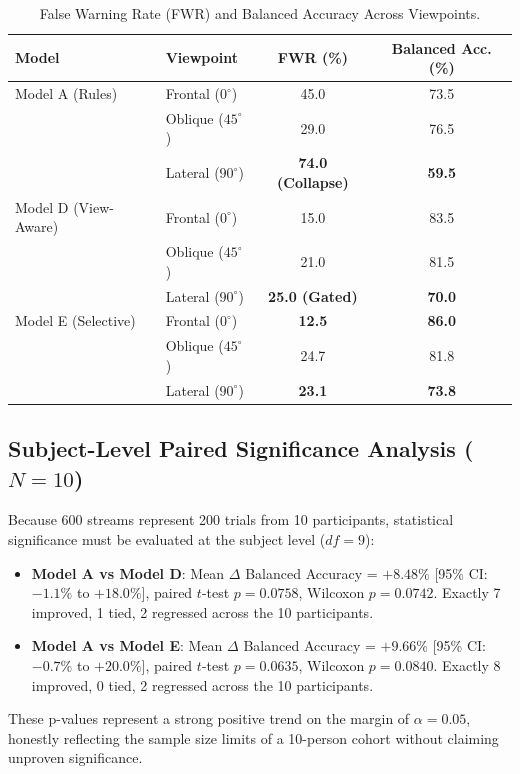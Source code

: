 \documentclass[10pt,journal,compsoc]{IEEEtran}
\begin{document}
\begin{table}[h]
\centering
\caption{False Warning Rate (FWR) and Balanced Accuracy Across Viewpoints.}
\label{tab:view_breakdown}
\small
\begin{tabular}{llcc}
\toprule
\textbf{Model} & \textbf{Viewpoint} & \textbf{FWR (\%)} & \textbf{Balanced Acc. (\%)} \\
\midrule
Model A (Rules) & Frontal ($0^\circ$) & 45.0 & 73.5 \\
                & Oblique ($45^\circ$) & 29.0 & 76.5 \\
                & Lateral ($90^\circ$) & \textbf{74.0 (Collapse)} & \textbf{59.5} \\
\midrule
Model D (View-Aware) & Frontal ($0^\circ$) & 15.0 & 83.5 \\
                     & Oblique ($45^\circ$) & 21.0 & 81.5 \\
                     & Lateral ($90^\circ$) & \textbf{25.0 (Gated)} & \textbf{70.0} \\
\midrule
Model E (Selective)  & Frontal ($0^\circ$) & \textbf{12.5} & \textbf{86.0} \\
                     & Oblique ($45^\circ$) & 24.7 & 81.8 \\
                     & Lateral ($90^\circ$) & \textbf{23.1} & \textbf{73.8} \\
\bottomrule
\end{tabular}
\end{table}

\subsection{Subject-Level Paired Significance Analysis ($N=10$)}
Because 600 streams represent 200 trials from 10 participants, statistical significance must be evaluated at the subject level ($df=9$):
\begin{itemize}
    \item \textbf{Model A vs Model D}: Mean $\Delta$ Balanced Accuracy = \textbf{$+8.48\%$} [95\% CI: $-1.1\%$ to $+18.0\%$], paired $t$-test $p = 0.0758$, Wilcoxon $p = 0.0742$. Exactly 7 improved, 1 tied, 2 regressed across the 10 participants.
    \item \textbf{Model A vs Model E}: Mean $\Delta$ Balanced Accuracy = \textbf{$+9.66\%$} [95\% CI: $-0.7\%$ to $+20.0\%$], paired $t$-test $p = 0.0635$, Wilcoxon $p = 0.0840$. Exactly 8 improved, 0 tied, 2 regressed across the 10 participants.
\end{itemize}
These p-values represent a strong positive trend on the margin of $\alpha=0.05$, honestly reflecting the sample size limits of a 10-person cohort without claiming unproven significance.
\end{document}
